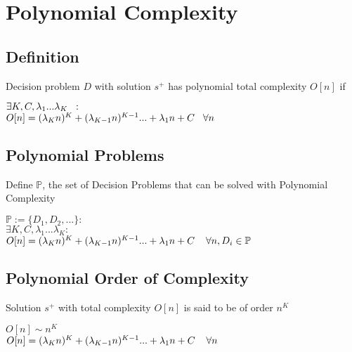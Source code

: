 \documentclass[11pt]{article}
\begin{document}
\section{Polynomial Complexity}

\subsection{Definition}
Decision problem $D$ with solution $s^+$ has polynomial total complexity $O[n]$ if
\begin{center}
$\exists K,C,\lambda_1...\lambda_K \hspace{2mm} :$
\\ \vspace{2mm}
$O[n] = (\lambda_K n)^K + (\lambda_{K-1} n)^{K-1}... + \lambda_1 n + C \hspace{3mm} \forall n$
\end{center}





\subsection{Polynomial Problems}
Define $\mathbb{P}$, the set of Decision Problems that can be solved with Polynomial Complexity
\begin{center}
$
\mathbb{P} := \{D_1,D_2,...\} : 
$
\\ \vspace{4mm}
$
\exists K,C,\lambda_1...\lambda_K : 
$
\\
$
O[n] = (\lambda_K n)^K + (\lambda_{K-1} n)^{K-1}... + \lambda_1 n + C \hspace{4mm} \forall n, D_i \in \mathbb{P}
$
\end{center}





\subsection{Polynomial Order of Complexity}
Solution $s^+$ with total complexity $O[n]$ is said to be of order $n^K$
\begin{center}
$
 O[n] \sim n^K
$
\\ \vspace{2mm}
$O[n] = (\lambda_{K} n)^{K} + (\lambda_{K-1} n)^{K-1}... + \lambda_1 n +  C \hspace{4mm} \forall n$
\end{center}
\end{document}
